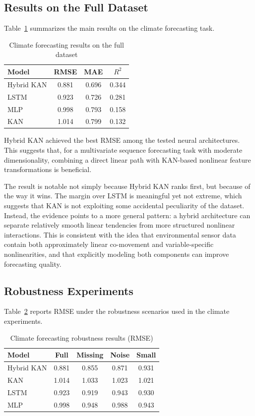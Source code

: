 \documentclass[10pt,conference,onecolumn]{IEEEtran}
\begin{document}
\subsection{Results on the Full Dataset}

Table~\ref{tab:climate_main} summarizes the main results on the climate forecasting task.

\begin{table}[t]
\centering
\caption{Climate forecasting results on the full dataset}
\label{tab:climate_main}
\begin{tabular}{lccc}
\toprule
Model & RMSE & MAE & $R^2$ \\
\midrule
Hybrid KAN & 0.881 & 0.696 & 0.344 \\
LSTM & 0.923 & 0.726 & 0.281 \\
MLP & 0.998 & 0.793 & 0.158 \\
KAN & 1.014 & 0.799 & 0.132 \\
\bottomrule
\end{tabular}
\end{table}

Hybrid KAN achieved the best RMSE among the tested neural architectures. This suggests that, for a multivariate sequence forecasting task with moderate dimensionality, combining a direct linear path with KAN-based nonlinear feature transformations is beneficial.

The result is notable not simply because Hybrid KAN ranks first, but because of the way it wins. The margin over LSTM is meaningful yet not extreme, which suggests that KAN is not exploiting some accidental peculiarity of the dataset. Instead, the evidence points to a more general pattern: a hybrid architecture can separate relatively smooth linear tendencies from more structured nonlinear interactions. This is consistent with the idea that environmental sensor data contain both approximately linear co-movement and variable-specific nonlinearities, and that explicitly modeling both components can improve forecasting quality.

\subsection{Robustness Experiments}

Table~\ref{tab:climate_robust} reports RMSE under the robustness scenarios used in the climate experiments.

\begin{table}[t]
\centering
\caption{Climate forecasting robustness results (RMSE)}
\label{tab:climate_robust}
\begin{tabular}{lcccc}
\toprule
Model & Full & Missing & Noise & Small \\
\midrule
Hybrid KAN & 0.881 & 0.855 & 0.871 & 0.931 \\
KAN & 1.014 & 1.033 & 1.023 & 1.021 \\
LSTM & 0.923 & 0.919 & 0.943 & 0.930 \\
MLP & 0.998 & 0.948 & 0.988 & 0.943 \\
\bottomrule
\end{tabular}
\end{table}
\end{document}
